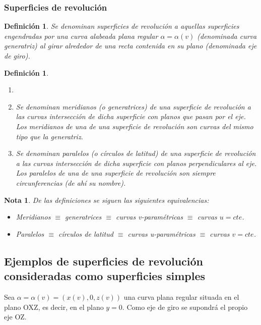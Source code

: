 \documentclass[twoside]{article}
\newtheorem{defi}[theorem]{Definición}
\newtheorem{nota}[theorem]{Nota}
\numberwithin{equation}{section}
\begin{document}
\subsubsection{Superficies de revolución}

\begin{defi} Se denominan {\em superficies de revoluci\'on} a aquellas superficies engendradas por una curva alabeada plana regular {\bf $\alpha = \alpha(v)$} (denominada curva generatriz) al girar alrededor de una recta contenida en su plano (denominada eje de giro).
\end{defi}
\newpage
\begin{defi} 
\begin{enumerate}
\item[]
\item [a)] Se denominan {\em meridianos} (o generatrices) de una superficie de revoluci\'on a las curvas intersecci\'on de dicha superficie con planos
que pasan por el eje. Los meridianos de una de una superficie de revoluci\'on son curvas del mismo tipo que la generatriz.

\item [b)] Se denominan {\em paralelos} (o c\'irculos de latitud) de una superficie de revoluci\'on a las curvas intersecci\'on de dicha superficie con planos perpendiculares al eje. Los paralelos de una de una superficie de revoluci\'on son siempre circunferencias (de ahí su nombre).
\end{enumerate}
\end{defi}
\begin{nota} De las definiciones se siguen las siguientes equivalencias:
\begin{itemize}
\item Meridianos $\equiv$ generatrices $\equiv$ curvas v-param\'etricas $\equiv$ curvas {\bf $u = cte$}.
\item Paralelos $\equiv$ c\'irculos de latitud $\equiv$ curvas u-param\'etricas $\equiv$ curvas {\bf $v = cte$}.
\end{itemize} 
\end{nota}


\subsection{Ejemplos de superficies de revoluci\'on consideradas como superficies simples}

Sea $\alpha = \alpha(v) = (x(v), 0, z(v))$ una curva plana
regular situada en el plano OXZ, es decir, en el plano $y = 0$. Como
eje de giro se supondr\'a el propio eje OZ.
\end{document}
